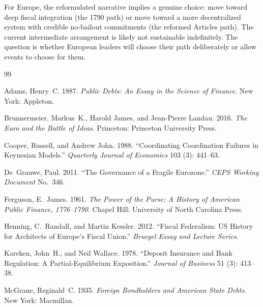\documentclass[12pt]{article}
\begin{document}
For Europe, the reformulated narrative implies a genuine choice: move
toward deep fiscal integration (the 1790 path) or move toward a more
decentralized system with credible no-bailout commitments (the reformed
Articles path). The current intermediate arrangement is likely not
sustainable indefinitely. The question is whether European leaders will
choose their path deliberately or allow events to choose for them.




\begin{thebibliography}{99}

Adams, Henry~C. 1887.
\newblock \emph{Public Debts: An Essay in the Science of Finance}.
\newblock New York: Appleton.

Brunnermeier, Markus~K., Harold James, and Jean-Pierre Landau. 2016.
\newblock \emph{The Euro and the Battle of Ideas}.
\newblock Princeton: Princeton University Press.

Cooper, Russell, and Andrew John. 1988.
\newblock ``Coordinating Coordination Failures in Keynesian Models.''
\newblock \emph{Quarterly Journal of Economics} 103 (3): 441--63.

De~Grauwe, Paul. 2011.
\newblock ``The Governance of a Fragile Eurozone.''
\newblock \emph{CEPS Working Document} No.~346.

Ferguson, E.~James. 1961.
\newblock \emph{The Power of the Purse: A History of American Public
  Finance, 1776--1790}.
\newblock Chapel Hill: University of North Carolina Press.

Henning, C.~Randall, and Martin Kessler. 2012.
\newblock ``Fiscal Federalism: US History for Architects of Europe's
  Fiscal Union.''
\newblock \emph{Bruegel Essay and Lecture Series}.

Kareken, John~H., and Neil Wallace. 1978.
\newblock ``Deposit Insurance and Bank Regulation: A Partial-Equilibrium
  Exposition.''
\newblock \emph{Journal of Business} 51 (3): 413--38.

McGrane, Reginald~C. 1935.
\newblock \emph{Foreign Bondholders and American State Debts}.
\newblock New York: Macmillan.


\end{thebibliography}
\end{document}
